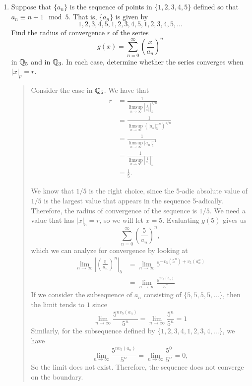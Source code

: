 \documentclass{hw}
\begin{document}
\begin{enumerate}
	\item Suppose that $\{a_{n}\}$ is the sequence of points in $\{1,2,3,4,5\}$ defined so that $a_{n}\equiv n+1 \mod 5$. That is, $\{a_{n}\}$ is given by
	      \[
	      	1,2,3,4,5,1,2,3,4,5,1,2,3,4,5,\dots
	      \]
	      Find the radius of convergence $r$ of the series
	      \[
	      	g(x)=\sum_{n=0}^{\infty}\left(\frac{x}{a_{n}}\right)^{n}
	      \]
	      in $\mathbb{Q}_{5}$ and in $\mathbb{Q}_{3}$. In each case, determine whether the series converges when $|x|_{p}=r$.
	      \begin{quote}
	      	Consider the case in $\mathbb{Q}_{5}$. We have that
	      	\begin{align*}
	      		r & = \frac{1}{\limsup_{n\to\infty}\left|\frac{1}{a_{n}^{n}}\right|_{5}^{1/n}}     \\
	      		  & = \frac{1}{\limsup_{n\to\infty}\left(\left|a_{n}\right|_{5}^{-n}\right)^{1/n}} \\
	      		  & = \frac{1}{\limsup_{n\to\infty}\left|a_{n}\right|_{5}^{-1}}                    \\
	      		  & = \frac{1}{\limsup_{n\to\infty}\left|\frac{1}{a_{n}}\right|_{5}}               \\
	      		  & = \frac{1}{5}.
	      	\end{align*}

	      	We know that $1/5$ is the right choice, since the 5-adic absolute value of $1/5$ is the largest value that appears in the sequence 5-adically. Therefore, the radius of convergence of the sequence is $1/5$. We need a value that has $|x|_{5}=r$, so we will let $x=5$. Evaluating $g(5)$ gives us
	      	\[
	      		\sum_{n=0}^{\infty}\left(\frac{5}{a_{n}}\right)^{n},
	      	\]
	      	which we can analyze for convergence by looking at
	      	\begin{align*}
	      		\lim_{n\to\infty}\left|\left(\frac{5}{a_{n}}\right)^{n}\right|_{5}
	      		  & =\lim_{n\to\infty}5^{-v_{5}(5^n)+v_{5}(a_{n}^n)}  \\
	      		  & =\lim_{n\to\infty}\frac{5^{nv_{5}(a_{n})}}{5^{n}}
	      	\end{align*}
	      	If we consider the subsequence of $a_{n}$ consisting of $\{5,5,5,5,\dots\}$, then the limit tends to $1$ since
	      	\[
	      		\lim_{n\to\infty}\frac{5^{nv_{5}(a_{n})}}{5^{n}}=\lim_{n\to\infty}\frac{5^{n}}{5^{n}}=1
	      	\]
	      	Similarly, for the subsequence defined by $\{1,2,3,4,1,2,3,4,\dots\}$, we have
	      	\[
	      		\lim_{n\to\infty}\frac{5^{nv_{5}(a_{n})}}{5^{n}}=\lim_{n\to\infty}\frac{5^{0}}{5^{n}}=0,
	      	\]
	      	So the limit does not exist. Therefore, the sequence does not converge on the boundary.


\end{quote}
\end{enumerate}
\end{document}
